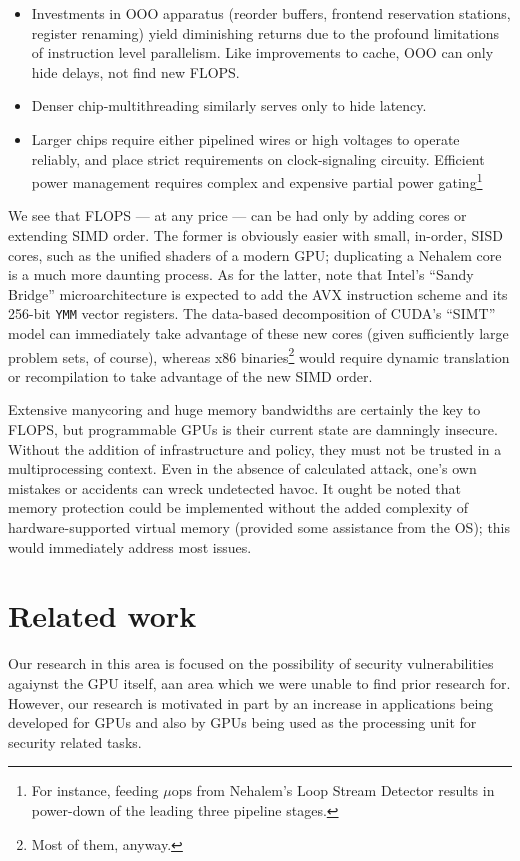 \documentclass[letterpaper,10pt]{article}
\begin{document}
\begin{multicols}{2}
\begin{itemize}
\item Investments in OOO apparatus (reorder buffers,
frontend reservation stations, register renaming) yield diminishing returns due
to the profound limitations of instruction level parallelism\cite{phenn}. Like improvements
to cache, OOO can only hide delays, not find new FLOPS.
\item Denser chip-multithreading similarly serves only to hide latency.
\item Larger chips require either pipelined wires or high voltages to operate
reliably, and place strict requirements on clock-signaling circuity. Efficient
power management requires complex and expensive partial power gating\footnote{For
instance, feeding $\mu$ops from Nehalem's Loop Stream Detector results in power-down
of the leading three pipeline stages.}
\end{itemize}
We see that FLOPS --- at any price --- can be had only by adding cores or extending
SIMD order. The former is obviously easier with small, in-order, SISD cores,
such as the unified shaders of a modern GPU; duplicating a Nehalem core is a
much more daunting process. As for the latter, note that Intel's ``Sandy
Bridge'' microarchitecture is expected to add the AVX instruction scheme and
its 256-bit \texttt{YMM} vector registers. The data-based decomposition of CUDA's
``SIMT'' model can immediately take advantage of these new cores (given
sufficiently large problem sets, of course), whereas x86 binaries\footnote{Most of them, anyway.} would
require dynamic translation or recompilation to take advantage of the new SIMD
order.

Extensive manycoring and huge memory bandwidths are certainly the key to FLOPS,
but programmable GPUs is their current state are damningly insecure. Without the
addition of infrastructure and policy, they must not be trusted in a
multiprocessing context. Even in the absence of calculated attack, one's own
mistakes or accidents can wreck undetected havoc. It ought be noted that memory
protection could be implemented without the added complexity of
hardware-supported virtual memory (provided some assistance from the OS); this
would immediately address most issues.

\section{Related work}
Our research in this area is focused on the possibility of security
vulnerabilities agaiynst the GPU itself, aan area which we were unable to find
prior research for. However, our research is motivated in part by an increase
in applications being developed for GPUs and also by GPUs being used as the
processing unit for security related tasks.
  

\end{multicols}
\end{document}
